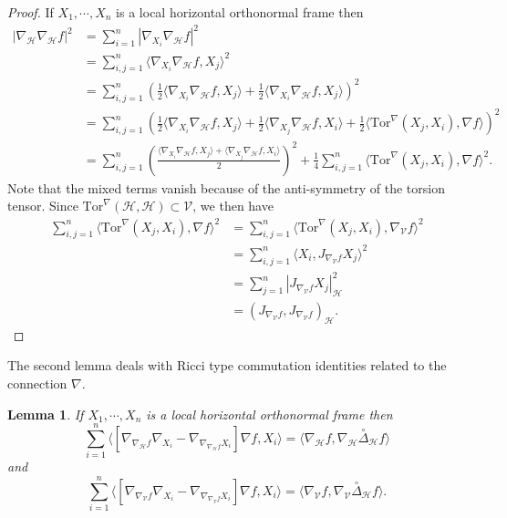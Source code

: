 \documentclass[11pt]{article}
\numberwithin{equation}{section}
\newtheorem{lemma}[theorem]{Lemma}
\newcommand{\Ho}{\mathcal H}
\newcommand{\V}{\mathcal V}
\newcommand{\hor}{\mathcal H}
\newcommand{\Tor}{\mathrm{Tor}}
\begin{document}
	\begin{proof}
		If $X_1,\cdots, X_n$ is a local horizontal orthonormal frame then
		\begin{align*}
			|\nabla_\Ho \nabla_\Ho f|^2 &=\sum_{i=1}^n |\nabla_{X_i} \nabla_\Ho f|^2 \\
			&=\sum_{i,j=1}^n \langle \nabla_{X_i} \nabla_\Ho f, X_j \rangle^2 \\
			&=\sum_{i,j=1}^n \left( \frac{1}{2} \langle \nabla_{X_i} \nabla_\Ho f, X_j \rangle+\frac{1}{2} \langle \nabla_{X_i} \nabla_\Ho f, X_j \rangle \right)^2  \\
			&=\sum_{i,j=1}^n \left( \frac{1}{2} \langle \nabla_{X_i} \nabla_\Ho f, X_j \rangle+\frac{1}{2} \langle \nabla_{X_j} \nabla_\Ho f, X_i \rangle+\frac{1}{2} \langle \Tor^\nabla (X_j,X_i) ,\nabla f \rangle \right)^2 \\
			&=\sum_{i,j=1}^n \left( \frac{\langle \nabla_{X_i} \nabla_\Ho f, X_j \rangle+\langle \nabla_{X_j} \nabla_\Ho f, X_i \rangle}{2} \right)^2+\frac{1}{4} \sum_{i,j=1}^n \langle \Tor^\nabla (X_j,X_i) ,\nabla f \rangle ^2.
		\end{align*}
        Note that the mixed terms vanish because of the anti-symmetry of the torsion tensor. Since $\Tor^\nabla(\hor,\hor) \subset \V$, we then have
		\begin{align*}
			\sum_{i,j=1}^n \langle \Tor^\nabla (X_j,X_i) ,\nabla f \rangle ^2&=\sum_{i,j=1}^n \langle \Tor^\nabla (X_j,X_i) ,\nabla_\V f \rangle ^2 \\
			&=\sum_{i,j=1}^n \langle X_i ,J_{\nabla_\V f} X_j \rangle ^2 \\
            &=\sum_{j=1}^n |J_{\nabla_\V f} X_j|_\Ho ^2 \\
			&=( J_{\nabla_\V f} , J_{\nabla_\V f} )_\Ho.
		\end{align*}
	\end{proof}
	The second lemma deals with Ricci type commutation identities related to the connection $\nabla$.
    
	\begin{lemma}\label{partial hessian} 
		If $X_1,\cdots, X_n$ is a local horizontal orthonormal frame then
		\[
		\sum_{i=1}^n \langle[\nabla_{\nabla_\mathcal{H}f} \nabla_{X_i}-\nabla_{\nabla_{\nabla_\mathcal{H}f} X_i}] \nabla f, X_i \rangle=\langle \nabla_{\mathcal{H}} f , \nabla_{\mathcal{H}}\overset{\circ}\Delta_{\mathcal{H}} f \rangle
		\]
		and
		\[
		\sum_{i=1}^n \langle[\nabla_{\nabla_\mathcal{V}f} \nabla_{X_i}-\nabla_{\nabla_{\nabla_\mathcal{V}f} X_i}] \nabla f, X_i \rangle=\langle \nabla_{\mathcal{V}} f , \nabla_{\mathcal{V}}\overset{\circ}\Delta_{\mathcal{H}} f \rangle.
		\]
	\end{lemma}
	
\end{document}
